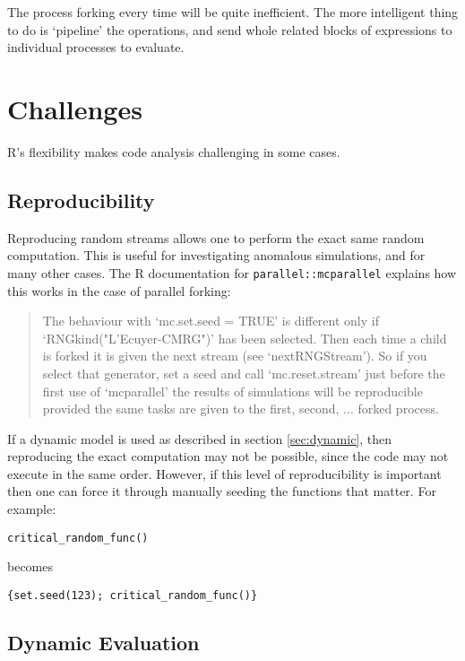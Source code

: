 \documentclass[12pt]{article}
\begin{document}
The process forking every time will be quite inefficient. The more intelligent
thing to do is `pipeline' the operations, and send whole related blocks of
expressions to individual processes to evaluate.

\section{Challenges}

R's flexibility makes code analysis challenging in some cases.

\subsection{Reproducibility}

Reproducing random streams allows one to perform the exact same random
computation. This is useful for investigating anomalous simulations, and
for many other cases. The R documentation for \texttt{parallel::mcparallel}
explains how this works in the case of parallel forking:

\begin{quote}
     The behaviour with ‘mc.set.seed = TRUE’ is different only if
     ‘RNGkind("L'Ecuyer-CMRG")’ has been selected.  Then each time a child
     is forked it is given the next stream (see ‘nextRNGStream’).  So if
     you select that generator, set a seed and call ‘mc.reset.stream’ just
     before the first use of ‘mcparallel’ the results of simulations will
     be reproducible provided the same tasks are given to the first,
     second, ...  forked process.
\end{quote}

If a dynamic model is used as described in section \ref{sec:dynamic}, then
reproducing the exact computation may not be possible, since the code may not execute in the
same order. However, if this level of reproducibility is important then one
can force it through manually seeding the functions that matter. For
example:
\begin{verbatim}
critical_random_func()
\end{verbatim}
becomes
\begin{verbatim}
{set.seed(123); critical_random_func()}
\end{verbatim}

\subsection{Dynamic Evaluation}
\end{document}

